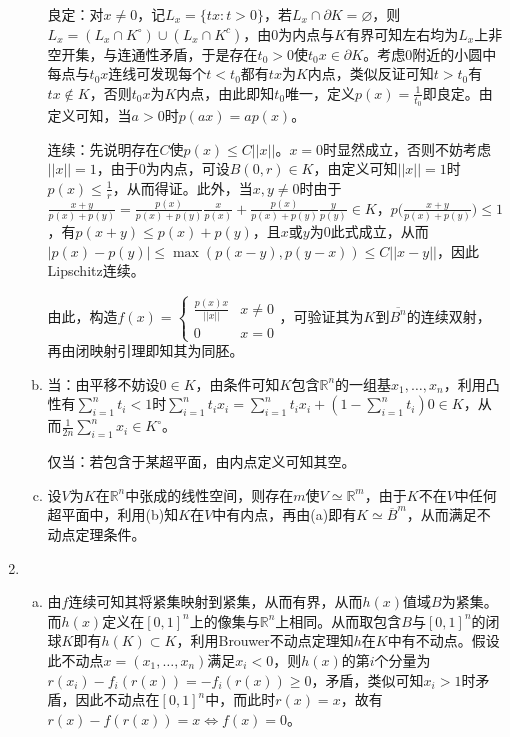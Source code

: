 \documentclass[a4paper,UTF8,fontset=windows]{ctexart}
\begin{document}
\begin{enumerate}[(1)]
\begin{enumerate}[(a)]
    良定：对$x\ne0$，记$L_x=\{tx:t>0\}$，若$L_x\cap\partial K=\varnothing$，则$L_x=(L_x\cap K^\circ)\cup(L_x\cap K^c)$，由0为内点与$K$有界可知左右均为$L_x$上非空开集，与连通性矛盾，于是存在$t_0>0$使$t_0x\in\partial K$。考虑0附近的小圆中每点与$t_0x$连线可发现每个$t<t_0$都有$tx$为$K$内点，类似反证可知$t>t_0$有$tx\notin K$，否则$t_0x$为$K$内点，由此即知$t_0$唯一，定义$p(x)=\frac{1}{t_0}$即良定。由定义可知，当$a>0$时$p(ax)=ap(x)$。
    
    连续：先说明存在$C$使$p(x)\le C||x||$。$x=0$时显然成立，否则不妨考虑$||x||=1$，由于0为内点，可设$B(0,r)\in K$，由定义可知$||x||=1$时$p(x)\le\frac{1}{r}$，从而得证。此外，当$x,y\ne0$时由于$\frac{x+y}{p(x)+p(y)}=\frac{p(x)}{p(x)+p(y)}\frac{x}{p(x)}+\frac{p(x)}{p(x)+p(y)}\frac{y}{p(y)}\in K$，$p\big(\frac{x+y}{p(x)+p(y)}\big)\le1$，有$p(x+y)\le p(x)+p(y)$，且$x$或$y$为0此式成立，从而$|p(x)-p(y)|\le\max(p(x-y),p(y-x))\le C||x-y||$，因此Lipschitz连续。
    
    由此，构造$f(x)=\begin{cases}\frac{p(x)x}{||x||}&x\ne0\\0&x=0\end{cases}$，可验证其为$K$到$\overline{B^n}$的连续双射，再由闭映射引理即知其为同胚。
    
    \item
    当：由平移不妨设$0\in K$，由条件可知$K$包含$\mathbb{R}^n$的一组基$x_1,\dots,x_n$，利用凸性有$\sum_{i=1}^nt_i<1$时$\sum_{i=1}^nt_ix_i=\sum_{i=1}^nt_ix_i+(1-\sum_{i=1}^nt_i)0\in K$，从而$\frac{1}{2n}\sum_{i=1}^nx_i\in K^\circ$。
    
    仅当：若包含于某超平面，由内点定义可知其空。
    
    \item
    设$V$为$K$在$\mathbb{R}^n$中张成的线性空间，则存在$m$使$V\simeq\mathbb{R}^m$，由于$K$不在$V$中任何超平面中，利用(b)知$K$在$V$中有内点，再由(a)即有$K\simeq\overline{B}^m$，从而满足不动点定理条件。
    \end{enumerate}
    
    \item
    \begin{enumerate}[(a)]
    \item
    由$f$连续可知其将紧集映射到紧集，从而有界，从而$h(x)$值域$B$为紧集。而$h(x)$定义在$[0,1]^n$上的像集与$\mathbb{R}^n$上相同。从而取包含$B$与$[0,1]^n$的闭球$K$即有$h(K)\subset K$，利用Brouwer不动点定理知$h$在$K$中有不动点。假设此不动点$x=(x_1,\dots,x_n)$满足$x_i<0$，则$h(x)$的第$i$个分量为$r(x_i)-f_i(r(x))=-f_i(r(x))\ge0$，矛盾，类似可知$x_i>1$时矛盾，因此不动点在$[0,1]^n$中，而此时$r(x)=x$，故有$r(x)-f(r(x))=x\Leftrightarrow f(x)=0$。
    

\end{enumerate}
\end{enumerate}
\end{document}
